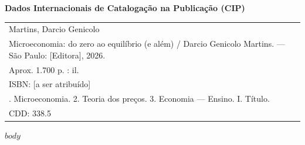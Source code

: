 \documentclass[11pt,twoside,openright]{book}
\begin{document}
\thispagestyle{empty}
\vspace*{\fill}
\begin{center}
\begin{minipage}{0.75\textwidth}
\small\sffamily
\textbf{Dados Internacionais de Catalogação na Publicação (CIP)}\\[12pt]
\begin{tabular}{@{}p{}@{}}
Martins, Darcio Genicolo\\
\quad Microeconomia: do zero ao equilíbrio (e além) / Darcio Genicolo Martins. --- São Paulo: [Editora], 2026.\\
\quad Aprox. 1.700 p. : il.\\[6pt]
\quad ISBN: [a ser atribuído]\\[6pt]
\quad 1. Microeconomia. 2. Teoria dos preços. 3. Economia --- Ensino. I. Título.\\[6pt]
\quad CDD: 338.5\\
\end{tabular}
\end{minipage}
\end{center}
\vspace{2cm}
\newpage

\frontmatter
\tableofcontents
\mainmatter

$body$
\end{document}
